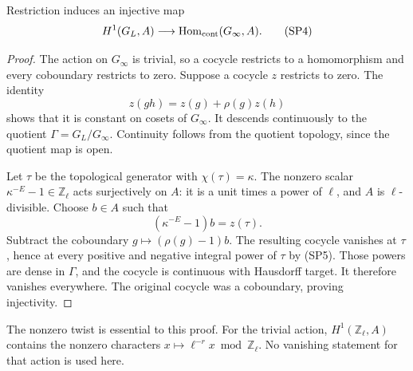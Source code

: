 \begin{lemma}\label{sp-restriction}
Restriction induces an injective map
\[
 H^1(G_L,A)\longrightarrow
                \operatorname{Hom}_{\rm cont}(G_\infty,A).
 \tag{SP4}
\]
\end{lemma}
\begin{proof}
The action on $G_\infty$ is trivial, so a cocycle restricts
to a homomorphism and every coboundary restricts to zero.
Suppose a cocycle $z$ restricts to zero.  The identity
\[
                     z(gh)=z(g)+\rho(g)z(h)
                     \tag{SP5}
\]
shows that it is constant on cosets of $G_\infty$.
It descends continuously to the quotient
$\Gamma=G_L/G_\infty$.  Continuity follows from the quotient
topology, since the quotient map is open.

Let $\tau$ be the topological generator with
$\chi(\tau)=\kappa$.  The nonzero scalar
$\kappa^{-E}-1\in\mathbb Z_\ell$ acts surjectively on $A$:
it is a unit times a power of $\ell$, and $A$ is
$\ell$-divisible.  Choose $b\in A$ such that
\[
                        (\kappa^{-E}-1)b=z(\tau).
\]
Subtract the coboundary $g\mapsto(\rho(g)-1)b$.
The resulting cocycle vanishes at $\tau$, hence at every
positive and negative integral power of $\tau$ by (SP5).
Those powers are dense in $\Gamma$, and the cocycle is
continuous with Hausdorff target.  It therefore vanishes
everywhere.  The original cocycle was a coboundary,
proving injectivity.
\end{proof}

The nonzero twist is essential to this proof.
For the trivial action, $H^1(\mathbb Z_\ell,A)$ contains
the nonzero characters
$x\mapsto \ell^{-r}x\bmod\mathbb Z_\ell$.
No vanishing statement for that action is used here.

